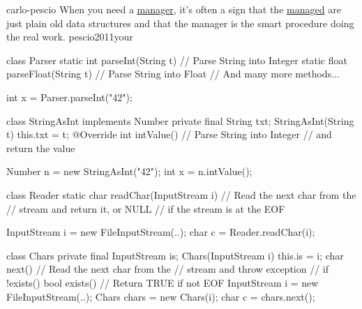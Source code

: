 \documentclass{article}
\begin{document}

\pptToc

\lnQuote
  {carlo-pescio}
  {When you need a \ul{manager}, it’s often a sign that the \ul{managed} are just plain old data structures and that the manager is the smart procedure doing the real work.}
  {pescio2011your}


\begin{pptWide}{2}
{\small\begin{ffcode}
class Parser {
  static int parseInt(String t) {
    // Parse String into Integer
  }
  static float parseFloat(String t) {
    // Parse String into Float
  }
  // And many more methods...
}

int x = Parser.parseInt("42");
\end{ffcode}
}
\par\columnbreak\par
{\small\begin{ffcode}
class StringAsInt implements Number {
  private final String txt;
  StringAsInt(String t) { this.txt = t; }
  @Override int intValue() {
    // Parse String into Integer
    // and return the value
  }
}

Number n = new StringAsInt("42");
int x = n.intValue();
\end{ffcode}
}
\end{pptWide}
\plush{}

\begin{pptWide}{2}
{\small\begin{ffcode}
class Reader {
  static char readChar(InputStream i) {
    // Read the next char from the
    // stream and return it, or NULL
    // if the stream is at the EOF
  }
}

InputStream i = new FileInputStream(..);
char c = Reader.readChar(i);
\end{ffcode}
}
\par\columnbreak\par
{\small\begin{ffcode}
class Chars
  private final InputStream is;
  Chars(InputStream i)
    this.is = i;
  char next()
    // Read the next char from the
    // stream and throw exception
    // if !exists()
  bool exists()
    // Return TRUE if not EOF
InputStream i = new FileInputStream(..);
Chars chars = new Chars(i);
char c = chars.next();
\end{ffcode}
}
\end{pptWide}
\plush{}
\end{document}
